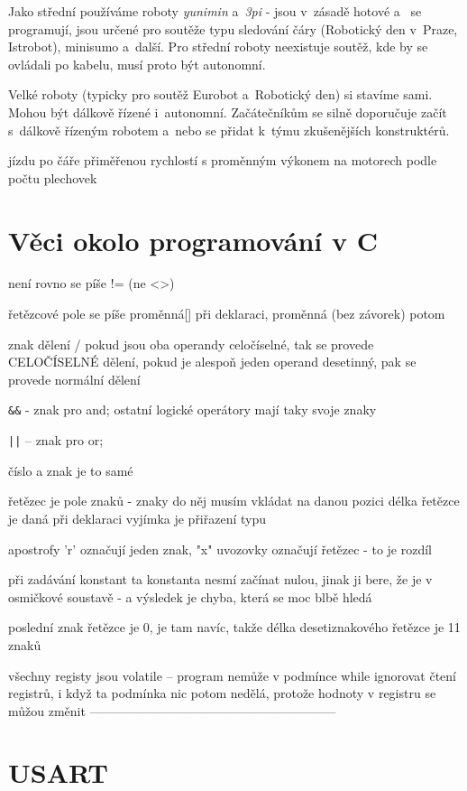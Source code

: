 
Jako střední používáme roboty {\it yunimin} a~{\it 3pi} - jsou v~zásadě hotové
a~ se programují, jsou určené pro soutěže typu sledování čáry (Robotický den v~Praze, Istrobot), minisumo a~další. 
Pro střední roboty neexistuje soutěž, kde by se ovládali po kabelu, musí proto být autonomní.    

Velké roboty (typicky pro soutěž Eurobot a~Robotický den) si stavíme sami. 
Mohou být dálkově řízené i~autonomní. 
Začátečníkům se silně doporučuje začít s~dálkově řízeným robotem a~nebo se přidat k~týmu zkušenějších konstruktérů.   


jízdu po čáře přiměřenou rychlostí
s proměnným výkonem na motorech podle počtu plechovek 


 \section{Věci okolo programování v C}
  
  není rovno se píše != (ne <>)
  
  řetězcové pole se píše proměnná[] při deklaraci, proměnná (bez závorek) potom 
  
 znak dělení /   pokud jsou oba operandy celočíselné, tak se provede CELOČÍSELNÉ dělení, pokud je alespoň jeden operand desetinný, pak se provede normální dělení
 
 \verb#&&# - znak pro and; ostatní logické operátory  mají taky svoje znaky 
 
 \verb#||# -- znak pro or;
 
 číslo a znak je to samé 
 
 řetězec je pole znaků - znaky do něj musím vkládat na danou pozici 
 délka řetězce je daná při deklaraci vyjímka je přiřazení typu   
 
 apostrofy 'r' označují jeden znak, "x" uvozovky označují řetězec - to je rozdíl 
 
 při zadávání konstant ta konstanta nesmí začínat nulou, jinak ji bere, že je v osmičkové soustavě - a výsledek je chyba, která se moc blbě hledá
 
poslední znak řetězce je 0, je tam navíc, takže délka desetiznakového řetězce je 11 znaků 

všechny registy jsou volatile -- program nemůže v podmínce while ignorovat čtení registrů, i když ta podmínka nic potom nedělá, protože hodnoty v registru se můžou změnit  
-----------------------------------------------------------

\section{USART}


